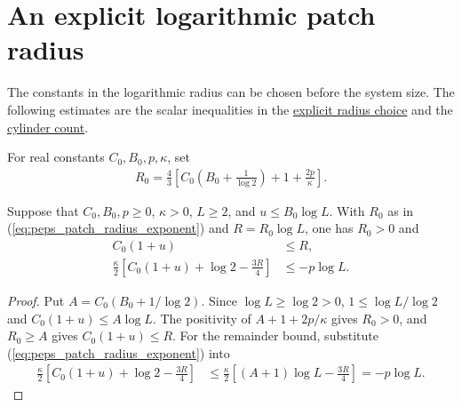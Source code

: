 \section{An explicit logarithmic patch radius}
\label{sec:peps_patch_radius_choice}

The constants in the logarithmic radius can be chosen before the system size.
The following estimates are the scalar inequalities in the
\href{https://github.com/openai/math/blob/adc7f1241b42e322a6451854ab7e4b4c146bf78a/preprints/Polynomial-PEPS-approximation-of-gapped-square-grid-ground-states-September-24-2026/build/sections/03-patches.tex\#L534-L563}{explicit radius choice}
and the \href{https://github.com/openai/math/blob/adc7f1241b42e322a6451854ab7e4b4c146bf78a/preprints/Polynomial-PEPS-approximation-of-gapped-square-grid-ground-states-September-24-2026/build/sections/03-patches.tex\#L595-L603}{cylinder count}.

\begin{definition}
    \label{def:peps_patch_radius_exponent}
    \leanok
    For real constants $C_0,B_0,p,\kappa$, set
    \begin{align}
        R_0=\frac43\left[C_0\left(B_0+\frac1{\log2}\right)
            +1+\frac{2p}{\kappa}\right].
        \label{eq:peps_patch_radius_exponent}
    \end{align}
\end{definition}

\begin{lemma}
    \label{thm:peps_patch_radius_bounds}
    \leanok
    Suppose that $C_0,B_0,p\ge0$, $\kappa>0$, $L\ge2$, and
    $u\le B_0\log L$. With $R_0$ as in
    (\ref{eq:peps_patch_radius_exponent}) and $R=R_0\log L$, one has $R_0>0$ and
    \begin{align}
        C_0(1+u) & \le R,       \\
        \frac{\kappa}{2}\left[C_0(1+u)+\log2-\frac{3R}{4}\right]
                 & \le-p\log L.
    \end{align}
\end{lemma}
\begin{proof}
    \leanok
    Put $A=C_0(B_0+1/\log2)$. Since $\log L\ge\log2>0$,
    $1\le\log L/\log2$ and $C_0(1+u)\le A\log L$.
    The positivity of $A+1+2p/\kappa$ gives $R_0>0$, and $R_0\ge A$
    gives $C_0(1+u)\le R$. For the remainder bound, substitute
    (\ref{eq:peps_patch_radius_exponent}) into
    \begin{align}
        \frac{\kappa}{2}\left[C_0(1+u)+\log2-\frac{3R}{4}\right]
         & \le\frac{\kappa}{2}\left[(A+1)\log L-\frac{3R}{4}\right]
        =-p\log L.
    \end{align}
\end{proof}

